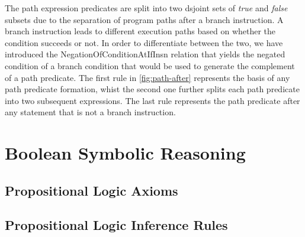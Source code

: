 The path expression predicates are split into two dsjoint sets of \emph{true} and \emph{false}
subsets due to the separation of program paths after a branch instruction. A branch
instruction leads to different execution paths based on whether the condition succeeds or not.
In order to differentiate between the two, we have introduced the
NegationOfConditionAtIfInsn relation that
yields the negated condition of a branch condition that would be used to
generate the complement of a path predicate. The first rule in \ref{fig:path-after}
represents the basis of any path predicate formation, whist the second one further
splits each path predicate into two subsequent expressions. The last rule represents
the path predicate after any statement that is not a branch instruction.


\section{Boolean Symbolic Reasoning}


\subsection{Propositional Logic Axioms}

\subsection{Propositional Logic Inference Rules}
